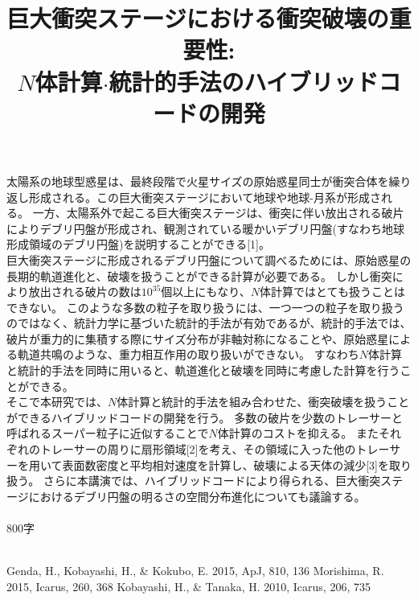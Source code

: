 \documentclass[11pt,a4paper]{jarticle}
\title{巨大衝突ステージにおける衝突破壊の重要性:\\
$N$体計算$\cdot$統計的手法のハイブリッドコードの開発}
\begin{document}
\maketitle



太陽系の地球型惑星は、最終段階で火星サイズの原始惑星同士が衝突合体を繰り返し形成される。この巨大衝突ステージにおいて地球や地球-月系が形成される。
一方、太陽系外で起こる巨大衝突ステージは、衝突に伴い放出される破片によりデブリ円盤が形成され、観測されている暖かいデブリ円盤(すなわち地球形成領域のデブリ円盤)を説明することができる[1]。
\\
\indent
巨大衝突ステージに形成されるデブリ円盤について調べるためには、原始惑星の長期的軌道進化と、破壊を扱うことができる計算が必要である。
しかし衝突により放出される破片の数は$10^{35}$個以上にもなり、$N$体計算ではとても扱うことはできない。
このような多数の粒子を取り扱うには、一つ一つの粒子を取り扱うのではなく、統計力学に基づいた統計的手法が有効であるが、統計的手法では、破片が重力的に集積する際にサイズ分布が非軸対称になることや、原始惑星による軌道共鳴のような、重力相互作用の取り扱いができない。
すなわち$N$体計算と統計的手法を同時に用いると、軌道進化と破壊を同時に考慮した計算を行うことができる。
\\
\indent
そこで本研究では、$N$体計算と統計的手法を組み合わせた、衝突破壊を扱うことができるハイブリッドコードの開発を行う。
多数の破片を少数のトレーサーと呼ばれるスーパー粒子に近似することで$N$体計算のコストを抑える。
またそれぞれのトレーサーの周りに扇形領域[2]を考え、その領域に入った他のトレーサーを用いて表面数密度と平均相対速度を計算し、破壊による天体の減少[3]を取り扱う。
さらに本講演では、ハイブリッドコードにより得られる、巨大衝突ステージにおけるデブリ円盤の明るさの空間分布進化についても議論する。
\\
\\
800字\\
\\

\begin{thebibliography}{9}
  Genda, H., Kobayashi, H., \& Kokubo, E. 2015, ApJ, 810, 136
  Morishima, R. 2015, Icarus, 260, 368
  Kobayashi, H., \& Tanaka, H. 2010, Icarus, 206, 735
\end{thebibliography}
\end{document}
